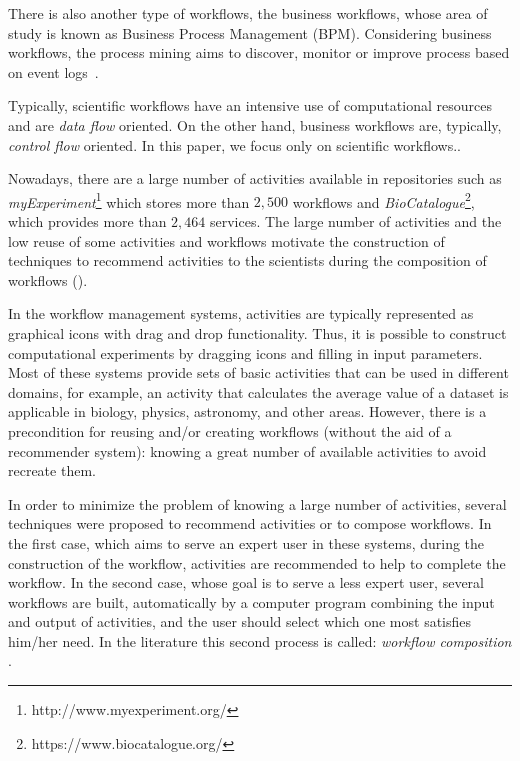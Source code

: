 \documentclass{RITA}
\begin{document}
There is also another type of workflows, the business workflows, whose area of study is known as Business Process Management (BPM). Considering business workflows, the process mining aims to discover, monitor or improve process based on event logs~\cite{Aalst2011}. 

Typically, scientific workflows have an intensive use of computational resources and are \emph{data flow} oriented. On the other hand, business workflows are, typically, \emph{control flow} oriented. In this paper, we focus only on scientific workflows..

Nowadays, there are a large number of activities available in repositories such as \emph{myExperiment}\footnote{http://www.myexperiment.org/} which stores more than $2,500$ workflows and \emph{BioCatalogue}\footnote{https://www.biocatalogue.org/}, which provides more than $2,464$ services. The large number of activities and the low reuse of some activities and workflows motivate the construction of techniques to recommend activities to the scientists during the composition of workflows (\cite{Wang2010}).

In the workflow management systems, activities are typically represented as graphical icons with drag and drop functionality. Thus, it is possible to construct computational experiments by dragging icons and filling in input parameters. Most of these systems provide sets of basic activities that can be used in different domains, for example, an activity that calculates the average value of a dataset is applicable in biology, physics, astronomy, and other areas. However, there is a precondition for reusing and/or creating workflows (without the aid of a recommender system): knowing a great number of available activities to avoid recreate them.

In order to minimize the problem of knowing a large number of activities, several techniques were proposed to recommend activities or to compose workflows. In the first case, which aims to serve an expert user in these systems, during the construction of the workflow, activities are recommended to help to complete the workflow. In the second case, whose goal is to serve a less expert user, several workflows are built, automatically by a computer program combining the input and output of activities, and the user should select which one most satisfies him/her need. In the literature this second process is called: \emph{workflow composition} \cite{Fei2012}.

\end{document}
